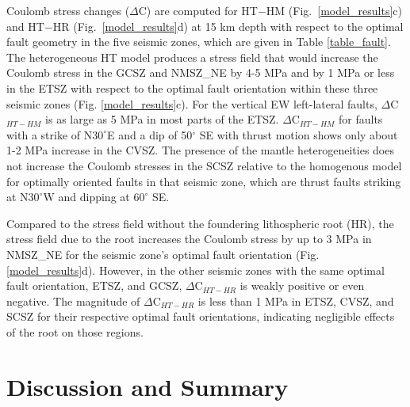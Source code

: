 \documentclass[draft,linenumbers]{agujournal2018}
\begin{document}
Coulomb stress changes ($\Delta $C) are computed for HT$-$HM (Fig.~\ref{model_results}c) and HT$-$HR (Fig.~\ref{model_results}d) at 15 km depth with respect to the optimal fault geometry in the five seismic zones, which are given in Table \ref{table_fault}. 
The heterogeneous HT model produces a stress field that would increase the Coulomb stress in the GCSZ and  NMSZ\_NE by 4-5 MPa and by 1 MPa or less in the ETSZ with respect to the optimal fault orientation within these three seismic zones (Fig. \ref{model_results}c). For the vertical EW left-lateral faults, $\Delta$C$_{HT-HM}$ is as large as 5 MPa in most parts of the ETSZ. $\Delta$C$_{HT-HM}$ for faults with a strike of N$30^\circ$E and a dip of 50$^\circ$ SE with thrust motion shows only about 1-2 MPa increase in the CVSZ. The presence of the mantle heterogeneities does not increase the Coulomb stresses in the SCSZ relative to the homogenous model for optimally oriented faults in that seismic zone, which are thrust faults striking at N$30^\circ$W and dipping at $60^\circ$ SE. %

Compared to the stress field without the foundering lithospheric root (HR), the stress field due to the root increases the Coulomb stress by up to 3 MPa in NMSZ\_NE for the seismic zone's optimal fault orientation (Fig. \ref{model_results}d). However, in the other seismic zones with the same optimal fault orientation, ETSZ, and GCSZ, $\Delta $C$_{HT-HR}$ is weakly positive or even negative. The magnitude of $\Delta $C$_{HT-HR}$ is less than 1 MPa in ETSZ, CVSZ, and SCSZ for their respective optimal fault orientations, indicating negligible effects of the root on those regions. 
    
\section{Discussion and Summary}
    
\end{document}
